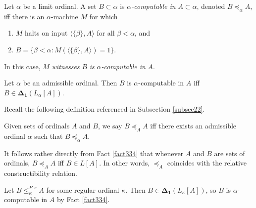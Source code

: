 \documentclass[12pt]{article}
\numberwithin{equation}{section}
\begin{document}
\begin{defi}
Let $\alpha$ be a limit ordinal. A set $B \subset \alpha$ is $\alpha$\emph{-computable in} $A \subset \alpha$, denoted $B \preceq_{\alpha} A$, iff there is an $\alpha$-machine $M$ for which
\begin{enumerate}[label=(\arabic*)]
    \item $M$ halts on input $\langle \{\beta\}, A \rangle$ for all $\beta < \alpha$, and
    \item $B = \{\beta < \alpha : M(\langle \{\beta\}, A \rangle) = 1\}$.
\end{enumerate}
In this case, $M$ \emph{witnesses} $B$ \emph{is} $\alpha$\emph{-computable in} $A$.
\end{defi}

\begin{fact}\label{fact334}
Let $\alpha$ be an admissible ordinal. Then $B$ is $\alpha$-computable in $A$ iff $B \in \mathbf{\Delta_1}(L_{\alpha}[A])$.
\end{fact}

Recall the following definition referenced in Subsection \ref{subsec22}.

\begin{defi}
Given sets of ordinals $A$ and $B$, we say $B \preceq_A A$ iff there exists an admissible ordinal $\alpha$ such that $B \preceq_{\alpha} A$.
\end{defi}

\begin{rem}\label{rem336}
It follows rather directly from Fact \ref{fact334} that whenever $A$ and $B$ are sets of ordinals, $B \preceq_A A$ iff $B \in L[A]$. In other words, $\preceq_A$ coincides with the relative constructibility relation.
\end{rem}

\begin{lem}\label{lem269}
Let $B \leq^{P, s}_{\kappa} A$ for some regular ordinal $\kappa$. Then $B \in \mathbf{\Delta_1}(L_{\kappa}[A])$, so $B$ is $\alpha$-computable in $A$ by Fact \ref{fact334}.
\end{lem}
\end{document}
